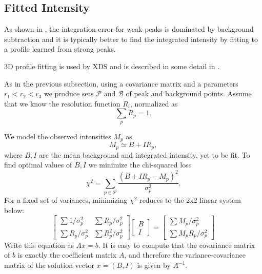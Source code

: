 \documentclass[11pt,a4paper]{article}
\def\calP{\mathcal{P}}
\def\calB{\mathcal{B}}
\begin{document}
\subsection{Fitted Intensity}

As shown in \cite{Dia69}, the integration error for weak peaks is dominated by background subtraction
and it is typically better to find the integrated intensity by fitting to a profile learned from strong peaks.

3D profile fitting is used by XDS \cite{Kab10a} and is described in some detail in \cite{Kab88,Kab10b}.

As in the previous subsection, using a covariance matrix and a parameters $r_1 < r_2 < r_3$ we produce sets $\calP$ and $\calB$ of peak and background points.
Assume that we know the resolution function $R_i$,
normalized as
\begin{equation}\label{Eresnor}
  \sum_p R_p = 1.
\end{equation}

We model the observed intensities $M_p$ as
\begin{equation} M_p \simeq B + I R_p, \end{equation}
where $B, I$ are the mean background and integrated intensity, yet to be fit. To find optimal values of $B,I$ we minimize the chi-squared loss
\begin{equation} \chi^2 = \sum_{p \in \calP} \frac{(B+IR_p - M_p)^2}{\sigma^2_p}. \end{equation}
For a fixed set of variances, minimizing $\chi^2$ reduces to the 2x2 linear system below:
\begin{equation}
  \begin{bmatrix}
    \sum 1/\sigma^2_p & \sum R_p / \sigma^2_p \\
    \sum R_p/\sigma_p^2 & \sum R_p^2 / \sigma^2_p
  \end{bmatrix}
  \begin{bmatrix}
    B \\
    I
  \end{bmatrix}
  =
  \begin{bmatrix}
    \sum M_p/\sigma^2_p \\
    \sum M_p R_p / \sigma^2_p
  \end{bmatrix}
\end{equation}
Write this equation as $Ax = b$. It is easy to compute that the covariance matrix of $b$ is exactly the coefficient matrix
 $A$, and therefore the variance-covariance matrix of the solution vector $x = (B, I)$ is given by $A^{-1}$.
\end{document}
